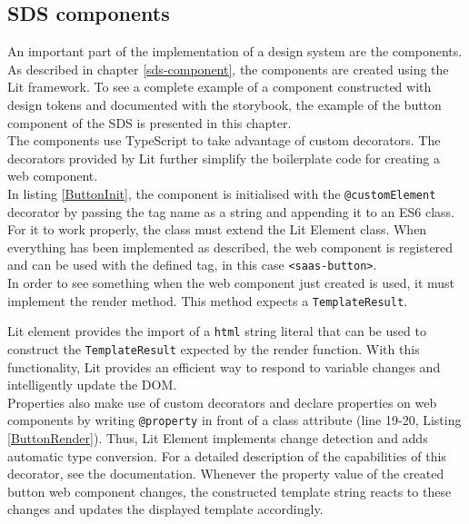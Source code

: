 \subsection{\ac{SDS} components}\label{sds_button}
An important part of the implementation of a design system are the components. As described in chapter \ref{sds-component}, the components are created using the Lit framework. To see a complete example of a component constructed with design tokens and documented with the storybook, the example of the button component of the \ac{SDS} is presented in this chapter. \\
The components use TypeScript to take advantage of custom decorators. The decorators provided by Lit further simplify the boilerplate code for creating a web component. \\

In listing \ref{ButtonInit}, the component is initialised with the \texttt{@customElement} decorator by passing the tag name as a string and appending it to an \ac{ES6} class. For it to work properly, the class must extend the Lit Element class. When everything has been implemented as described, the web component is registered and can be used with the defined tag, in this case \texttt{<saas-button>}. \\
In order to see something when the web component just created is used, it must implement the render method. This method expects a \texttt{TemplateResult}. 

Lit element provides the import of a \texttt{html} string literal that can be used to construct the \texttt{TemplateResult} expected by the render function. With this functionality, Lit provides an efficient way to respond to variable changes and intelligently update the \ac{DOM}. \\
Properties also make use of custom decorators and declare properties on web components by writing \texttt{@property} in front of a class attribute (line 19-20, Listing \ref{ButtonRender}). Thus, Lit Element implements change detection and adds automatic type conversion. For a detailed description of the capabilities of this decorator, see the documentation. Whenever the property value of the created button web component changes, the constructed template string reacts to these changes and updates the displayed template accordingly. \\
